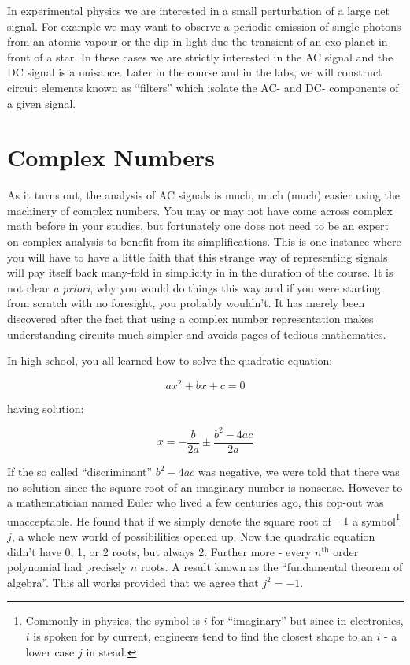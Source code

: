 \documentclass{tufte-book}
\begin{document}
In experimental physics we are interested in a small perturbation of a large net signal. For example we may want to observe a periodic emission of single photons from an atomic vapour or the dip in light due the transient of an exo-planet in front of a star. In these cases we are strictly interested in the AC signal and the DC signal is a nuisance. Later in the course and in the labs, we will construct circuit elements known as ``filters'' which isolate the AC- and DC- components of a given signal.

\section{Complex Numbers}

As it turns out, the analysis of AC signals is much, much (much) easier using the machinery of complex numbers. You may or may not have come across complex math before in your studies, but fortunately one does not need to be an expert on complex analysis to benefit from its simplifications. This is one instance where you will have to have a little faith that this strange way of representing signals will pay itself back many-fold in simplicity in in the duration of the course. It is not clear \textit{a priori}, why you would do things this way and if you were starting from scratch with no foresight, you probably wouldn't. It has merely been discovered after the fact that using a complex number representation makes understanding circuits much simpler and avoids pages of tedious mathematics. 

In high school, you all learned how to solve the quadratic equation:

$$
ax^2 + bx + c = 0
$$

\noindent having solution:

$$
x = -\frac{b}{2a} \pm \frac{b^2-4ac}{2a}
$$

If the so called ``discriminant'' $b^2 - 4ac$ was negative, we were told that there was no solution since the square root of an imaginary number is nonsense. However to a mathematician named Euler who lived a few centuries ago, this cop-out was unacceptable. He found that if we simply denote the square root of $-1$ a symbol\footnote{Commonly in physics, the symbol is $i$ for ``imaginary'' but since in electronics, $i$ is spoken for by current, engineers tend to find the closest shape to an $i$ - a lower case $j$ in stead.} $j$, a whole new world of possibilities opened up. Now the quadratic equation didn't have 0, 1, or 2 roots, but always 2. Further more - every $n^{\text{th}}$ order polynomial had precisely $n$ roots. A result known as the ``fundamental theorem of algebra''. This all works provided that we agree that $j^2 = -1$. 
\end{document}
